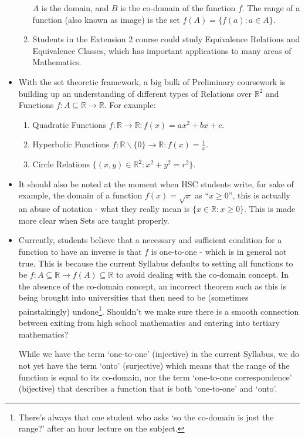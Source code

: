 \documentclass[11pt, a4paper, oneside]{article}
\begin{document}
\begin{itemize}
\begin{enumerate}
\begin{center}
        $A$ is the domain, and $B$ is the co-domain of the function $f$. The range of a function (also known as image) is the set $f(A) = \{f(a) : a \in A\}$.
      \end{center}
    \item Students in the Extension 2 course could study Equivalence Relations and Equivalence Classes, which has important applications to many areas of Mathematics.
    \end{enumerate}
  \item With the set theoretic framework, a big bulk of Preliminary coursework is building up an understanding of different types of Relations over $\mathbb{R}^2$ and Functions $f: A \subseteq \mathbb{R} \rightarrow \mathbb{R}$. For example:
    \begin{enumerate}
      \item Quadratic Functions $f: \mathbb{R} \rightarrow \mathbb{R}: f(x) = ax^2 + bx + c$.
      \item Hyperbolic Functions $f: \mathbb{R}\backslash\{0\} \rightarrow \mathbb{R}: f(x) = \frac{1}{x}$.
      \item Circle Relations $\{ (x,y) \in \mathbb{R}^2: x^2 + y^2 = r^2 \}$.
    \end{enumerate}
  \item It should also be noted at the moment when HSC students write, for sake of example, the domain of a function $f(x) = \sqrt{x}$ as ``$x \geq 0$'', this is actually an abuse of notation - what they really mean is $\{ x \in \mathbb{R}: x \geq 0\}$. This is made more clear when Sets are taught properly.
  \item Currently, students believe that a necessary and sufficient condition for a function to have an inverse is that $f$ is one-to-one - which is in general not true. This is because the current Syllabus defaults to setting all functions to be $f: A \subseteq \mathbb{R} \rightarrow f(A) \subseteq \mathbb{R}$ to avoid dealing with the co-domain concept. In the absence of the co-domain concept, an incorrect theorem such as this is being brought into universities that then need to be (sometimes painstakingly) undone\footnote{There's always that one student who asks `so the co-domain is just the range?' after an hour lecture on the subject.}. Shouldn't we make sure there is a smooth connection between exiting from high school mathematics and entering into tertiary mathematics?

    While we have the term `one-to-one' (injective) in the current Syllabus, we do not yet have the term `onto' (surjective) which means that the range of the function is equal to its co-domain, nor the term `one-to-one correspondence' (bijective) that describes a function that is both `one-to-one' and `onto'.


\end{itemize}
\end{document}
